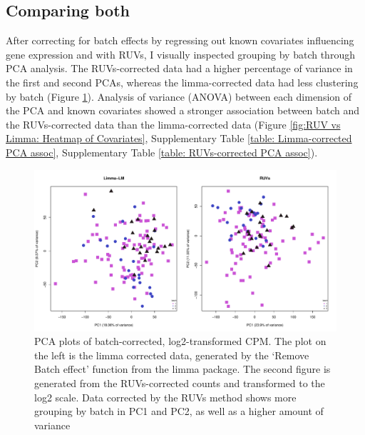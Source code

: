 \documentclass[12pt,a4paper,titlepage,twoside,openright]{book}
\begin{document}
\begin{mainmatter}
{{\section{Comparing both}
After correcting for batch effects by regressing out known covariates influencing gene expression and with RUVs, I visually inspected grouping by batch through PCA analysis. The RUVs-corrected data had a higher percentage of variance in the first and second PCAs, whereas the limma-corrected data had less clustering by batch (﻿Figure \ref{fig:RUV vs Limma: PCA by Batch}). Analysis of variance (ANOVA) between each dimension of the PCA and known covariates showed a stronger association between batch and the RUVs-corrected data than the limma-corrected data (﻿Figure \ref{fig:RUV vs Limma: Heatmap of Covariates}﻿, Supplementary Table \ref{table: Limma-corrected PCA assoc}, Supplementary Table \ref{table: RUVs-corrected PCA assoc}). 

\begin{figure}[htb!]
\centering
\includegraphics[width=\textwidth,height=\textheight,keepaspectratio]{Figures/PCA_RUVvsLM_FirstDimension.pdf}
\caption{PCA plots of batch-corrected, log2-transformed CPM. The plot on the left is the limma corrected data, generated by the ‘Remove Batch effect’ function from the limma package. The second figure is generated from the RUVs-corrected counts and transformed to the log2 scale. Data corrected by the RUVs method shows more grouping by batch in PC1 and PC2, as well as a higher amount of variance}
\label{fig:RUV vs Limma: PCA by Batch}
\end{figure}


}}
\end{mainmatter}
\end{document}
